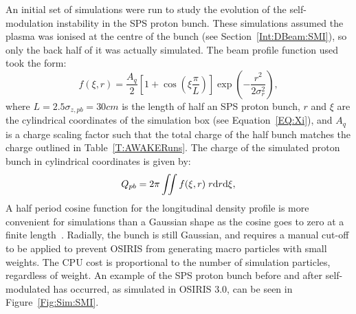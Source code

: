 An initial set of simulations were run to study the evolution of the self-modulation instability in the SPS proton bunch.
These simulations assumed the plasma was ionised at the centre of the bunch (see Section~\ref{Int:DBeam:SMI}), so only the back half of it was actually simulated.
The beam profile function used took the form:
\begin{equation}
    f(\xi,r) = \frac{A_{q}}{2} \left[1 + \cos\left(\xi\frac{\pi}{L}\right)\right] \exp\left(-\frac{r^{2}}{2\sigma_{r}^{2}}\right), \label{EQ:SPS-Profile}
\end{equation}
where $L = 2.5\sigma_{z,pb} = 30\unit{cm}$ is the length of half an SPS proton bunch, $r$ and $\xi$ are the cylindrical coordinates of the simulation box (see Equation~\ref{EQ:Xi}), and $A_{q}$ is a charge scaling factor such that the total charge of the half bunch matches the charge outlined in Table~\ref{T:AWAKERuns}.
The charge of the simulated proton bunch in cylindrical coordinates is given by:
\begin{equation}
    Q_{pb} = 2\pi \iint f(\xi,r) \;r \mathrm{d} r \mathrm{d} \xi, \label{EQ:SPS-Charge}
\end{equation}
A half period cosine function for the longitudinal density profile is more convenient for simulations than a Gaussian shape as the cosine goes to zero at a finite length~\cite{lotov:2010}.
Radially, the bunch is still Gaussian, and requires a manual cut-off to be applied to prevent OSIRIS from generating macro particles with small weights.
The CPU cost is proportional to the number of simulation particles, regardless of weight.
An example of the SPS proton bunch before and after self-modulated has occurred, as simulated in OSIRIS 3.0, can be seen in Figure~\ref{Fig:Sim:SMI}.

